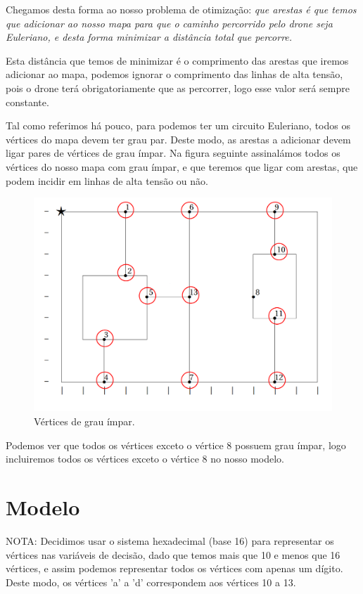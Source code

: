 \documentclass{article}
\begin{document}
Chegamos desta forma ao nosso problema de otimização: \emph{que arestas é que temos que adicionar ao nosso mapa para que o caminho percorrido pelo drone seja Euleriano, e desta forma minimizar a distância total que percorre.}

Esta distância que temos de minimizar é o comprimento das arestas que iremos adicionar ao mapa, podemos ignorar o comprimento das linhas de alta tensão, pois o drone terá obrigatoriamente que as percorrer, logo esse valor será sempre constante.

Tal como referimos há pouco, para podemos ter um circuito Euleriano, todos os vértices do mapa devem ter grau par. Deste modo, as arestas a adicionar devem ligar pares de vértices de grau ímpar. Na figura seguinte assinalámos todos os vértices do nosso mapa com grau ímpar, e que teremos que ligar com arestas, que podem incidir em linhas de alta tensão ou não.

\begin{figure}[h]
    \centering
    \includegraphics[width=0.8\linewidth]{fig2.png}
    \caption{Vértices de grau ímpar.}
    \label{verticesimpares}
\end{figure}

Podemos ver que todos os vértices exceto o vértice 8 possuem grau ímpar, logo incluiremos todos os vértices exceto o vértice 8 no nosso modelo.

\section{Modelo}

NOTA: Decidimos usar o sistema hexadecimal (base 16) para representar os vértices nas variáveis de decisão, dado que temos mais que 10 e menos que 16 vértices, e assim podemos representar todos os vértices com apenas um dígito. Deste modo, os vértices 'a' a 'd' correspondem aos vértices 10 a 13.
\end{document}
